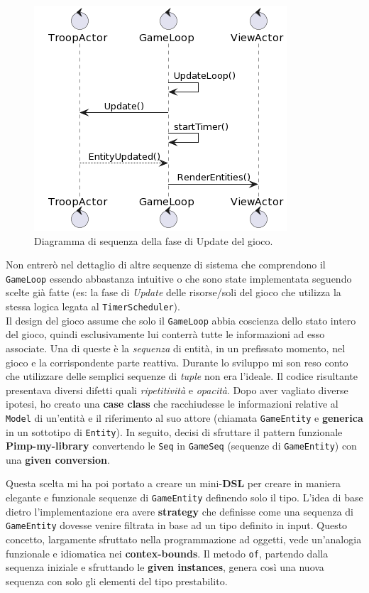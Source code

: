 \begin{figure}[H]
    \centering
    \includegraphics[width=0.61\linewidth]{images/game-update.png}
    \caption{Diagramma di sequenza della fase di Update del gioco.}
\end{figure}
Non entrerò nel dettaglio di altre sequenze di sistema che comprendono il \texttt{GameLoop} essendo abbastanza intuitive o che sono state implementata seguendo scelte già fatte (es: la fase di \textit{Update} delle risorse/soli del gioco che utilizza la stessa logica legata al \texttt{TimerScheduler}).\\

Il design del gioco assume che solo il \texttt{GameLoop} abbia coscienza dello stato intero del gioco, quindi esclusivamente lui conterrà tutte le informazioni ad esso associate. Una di queste è la \textit{sequenza} di entità, in un prefissato momento, nel gioco e la corrispondente parte reattiva. Durante lo sviluppo mi son reso conto che utilizzare delle semplici sequenze di \textit{tuple} non era l'ideale. Il codice risultante presentava diversi difetti quali \textit{ripetitività} e \textit{opacità}. Dopo aver vagliato diverse ipotesi, ho creato una \textbf{case class} che racchiudesse le informazioni relative al \texttt{Model} di un'entità e il riferimento al suo attore (chiamata \texttt{GameEntity} e \textbf{generica} in un sottotipo di \texttt{Entity}). In seguito, decisi di sfruttare il pattern funzionale \textbf{Pimp-my-library} convertendo le \texttt{Seq} in \texttt{GameSeq} (sequenze di \texttt{GameEntity}) con una \textbf{given conversion}.



Questa scelta mi ha poi portato a creare un mini-\textbf{DSL} per creare in maniera elegante e funzionale sequenze di \texttt{GameEntity} definendo solo il tipo. L'idea di base dietro l'implementazione era avere \textbf{strategy} che definisse come una sequenza di \texttt{GameEntity} dovesse venire filtrata in base ad un tipo definito in input. Questo concetto, largamente sfruttato nella programmazione ad oggetti, vede un'analogia funzionale e idiomatica nei \textbf{contex-bounds}. Il metodo \texttt{of}, partendo dalla sequenza iniziale e sfruttando le \textbf{given instances}, genera così una nuova sequenza con solo gli elementi del tipo prestabilito. 

